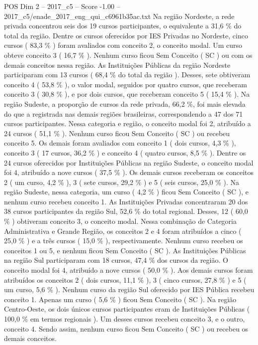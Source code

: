 \begin{textsample}{POS Dim 2 – 2017\_c5 – Score -1.00 – 2017\_c5/enade\_2017\_eng\_qui\_c6961b35ac.txt}
Na região Nordeste, a rede privada concentrou seis dos 19 cursos participantes, o equivalente a 31,6 \% do total da região.
Dentre os cursos oferecidos por IES Privadas no Nordeste, cinco cursos ( 83,3 \% ) foram avaliados com conceito 2, o conceito modal.
Um curso obteve conceito 3 ( 16,7 \% ).
Nenhum curso ficou Sem Conceito ( SC ) ou com os demais conceitos nessa região.
As Instituições Públicas da região Nordeste participaram com 13 cursos ( 68,4 \% do total da região ).
Desses, sete obtiveram conceito 4 ( 53,8 \% ), o valor modal, seguidos por quatro cursos, que receberam conceito 3 ( 30,8 \% ), e por dois cursos, que receberam conceito 5 ( 15,4 \% ).
Na região Sudeste, a proporção de cursos da rede privada, 66,2 \%, foi mais elevada do que a registrada nas demais regiões brasileiras, correspondendo a 47 dos 71 cursos participantes.
Nessa categoria e região, o conceito modal foi 2, atribuído a 24 cursos ( 51,1 \% ).
Nenhum curso ficou Sem Conceito ( SC ) ou recebeu conceito 5.
Os demais foram avaliados com conceito 1 ( dois cursos, 4,3 \% ), conceito 3 ( 17 cursos, 36,2 \% ) e conceito 4 ( quatro cursos, 8,5 \% ).
Dentre os 24 cursos oferecidos por Instituições Públicas na região Sudeste, o conceito modal foi 4, atribuído a nove cursos ( 37,5 \% ).
Os demais cursos receberam os conceitos 2 ( um curso, 4,2 \% ), 3 ( sete cursos, 29,2 \% ) e 5 ( seis cursos, 25,0 \% ).
Na região Sudeste, nessa categoria, um curso ( 4,2 \% ) ficou Sem Conceito ( SC ), e nenhum curso recebeu conceito 1.
As Instituições Privadas concentraram 20 dos 38 cursos participantes da região Sul, 52,6 \% do total regional.
Desses, 12 ( 60,0 \% ) obtiveram conceito 3, o conceito modal.
Nessa combinação de Categoria Administrativa e Grande Região, os conceitos 2 e 4 foram atribuídos a cinco ( 25,0 \% ) e a três cursos ( 15,0 \% ), respectivamente.
Nenhum curso recebeu os conceitos 1 ou 5, e nenhum ficou Sem Conceito ( SC ).
As Instituições Públicas na região Sul participaram com 18 cursos, 47,4 \% dos cursos da região.
O conceito modal foi 4, atribuído a nove cursos ( 50,0 \% ).
Aos demais cursos foram atribuídos os conceitos 2 ( dois cursos, 11,1 \% ), 3 ( cinco cursos, 27,8 \% ) e 5 ( um curso, 5,6 \% ).
Nenhum curso da região Sul oferecido por IES Pública recebeu conceito 1.
Apenas um curso ( 5,6 \% ) ficou Sem Conceito ( SC ).
Na região Centro-Oeste, os dois únicos cursos participantes eram de Instituições Públicas ( 100,0 \% em termos regionais ).
Um desses cursos recebeu conceito 3, e o outro, conceito 4.
Sendo assim, nenhum curso ficou Sem Conceito ( SC ) ou recebeu os demais conceitos.

\end{textsample}
